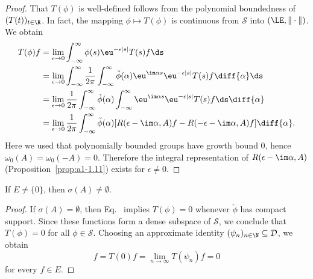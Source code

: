 \begin{proof}
That $T(\phi)$ is well-defined follows from the polynomial boundedness of\/ $(T(t))_{t\in\R}$.
In fact, the mapping $\phi \mapsto T(\phi)$ is continuous from $\mathcal{S}$ into $(\LE,\|\cdot\|)$.
We obtain
\begin{align*}
	T(\phi)f &= \lim_{\epsilon\to 0} \int_{-\infty}^{\infty} \phi(s)\eu^{-\epsilon|s|}T(s)f \ds \\
	&= \lim_{\epsilon\to 0} \int_{-\infty}^{\infty} \frac{1}{2\pi}\int_{-\infty}^{\infty} \check{\phi}(\alpha)\eu^{\im\alpha s}\eu^{-\epsilon|s|}T(s)f \diff{\alpha} \ds \\
	&= \lim_{\epsilon\to 0} \frac{1}{2\pi}\int_{-\infty}^{\infty} \check{\phi}(\alpha)\int_{-\infty}^{\infty} \eu^{\im\alpha s}\eu^{-\epsilon|s|}T(s)f \ds \diff{\alpha}\\
	&= \lim_{\epsilon\to 0} \frac{1}{2\pi}\int_{-\infty}^{\infty} \check{\phi}(\alpha)[R(\epsilon-\im\alpha,A)f - R(-\epsilon-\im\alpha,A)f] \diff{\alpha}  .
\end{align*}
Here we used that polynomially bounded groups have growth bound $0$, hence $\omega_{0}(A) = \omega_{0}(-A) = 0$.
Therefore the integral representation of\/ $R(\epsilon-\im\alpha,A)$ (\cf Proposition~\ref{prop:a1-1.11}) exists for $\epsilon \neq 0$.
\end{proof}
\begin{lemma}\label{lem:a3-7.6}
If\/ $E \neq \{0\}$, then $\sigma(A) \neq \emptyset$.
\end{lemma}
\begin{proof}
If\/ $\sigma(A) = \emptyset$, then Eq.~ implies $T(\phi) = 0$ whenever $\check{\phi}$ has compact support.
Since these functions form a dense subspace of\/ $\mathcal{S}$, we conclude that $T(\phi) = 0$ for all $\phi \in \mathcal{S}$.
Choosing an approximate identity $(\psi_{n})_{n\in\N} \subseteq \mathcal{D}$, we obtain
\[
f = T(0)f = \lim_{n\to\infty} T(\psi_{n})f = 0
\]
for every $f \in E$.
\end{proof}
